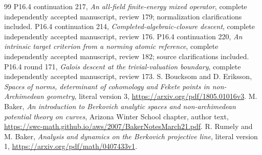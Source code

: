 \documentclass[11pt]{article}
\begin{document}
\begin{thebibliography}{99}\small
{} P16.4 continuation 217, \emph{An all-field finite-energy
mixed operator}, complete independently accepted manuscript,
review 179; normalization clarifications included.
 P16.4 continuation 214, \emph{Completed-algebraic-closure
descent}, complete independently accepted manuscript, review 176.
 P16.4 continuation 220, \emph{An intrinsic target
criterion from a norming atomic reference}, complete independently
accepted manuscript, review 182; source clarifications included.
 P16.4 round 171, \emph{Galois descent at the
trivial-valuation boundary}, complete independently accepted
manuscript, review 173.
 S. Boucksom and D. Eriksson, \emph{Spaces of norms,
determinant of cohomology and Fekete points in non-Archimedean
geometry}, literal version 3,
\url{https://arxiv.org/pdf/1805.01016v3}.
 M. Baker, \emph{An introduction to Berkovich analytic
spaces and non-archimedean potential theory on curves}, Arizona
Winter School chapter, author text,
\url{https://swc-math.github.io/aws/2007/BakerNotesMarch21.pdf}.
 R. Rumely and M. Baker, \emph{Analysis and dynamics
on the Berkovich projective line}, literal version 1,
\url{https://arxiv.org/pdf/math/0407433v1}.
\end{thebibliography}
\end{document}

